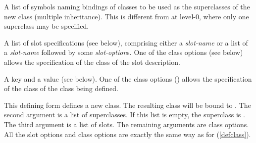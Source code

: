 %
\begin{optDefinition}
\label{defclass-1}
%
\Syntax
\label{defclass-syntax}
%
\begin{arguments}
    \item[\scref{superclass-list}] A list of symbols naming bindings of classes
    to be used as the superclasses of the new class (multiple
    inheritance).  This is different from  at level-0,
    where only one superclass may be specified.

    \item[\scref{slot-1}] A list of slot specifications (see
    below), comprising either a {\em slot-name} or a list of a {\em slot-name}
    followed by some {\em slot-option}s.  One of the class options (see below)
    allows the specification of the class of the slot description.

    \item[\scref{class-option-1}] A key and a value (see below).  One of
    the class options () allows the specification of the class
    of the class being defined.
\end{arguments}
%
\remarks%
This defining form defines a new class.  The resulting class will be
bound to .  The second argument is a list of
superclasses.  If this list is empty, the superclass is .
The third argument is a list of slots.  The remaining
arguments are class options.  All the slot options and class options
are exactly the same way as for  (\ref{defclass}).


\end{optDefinition}
